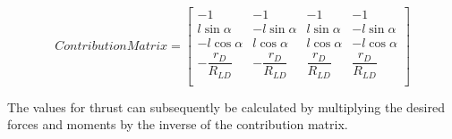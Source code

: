 	\begin{equation}
	\label{EQ_MotorMixerMatrix}
	Contribution Matrix = 
	\begin{bmatrix}
	-1 & -1 & -1 & -1 \\
	l\sin\alpha & -l\sin\alpha & l\sin\alpha & -l\sin\alpha\\
	-l\cos\alpha & l\cos\alpha & l\cos\alpha & -l\cos\alpha \\
	-\dfrac{r_D}{R_{LD}} & -\dfrac{r_D}{R_{LD}} & \dfrac{r_D}{R_{LD}} & \dfrac{r_D}{R_{LD}} \\
	\end{bmatrix}
	\end{equation}
	
	The values for thrust can subsequently be calculated by multiplying the desired forces and moments by the inverse of the contribution matrix.


		